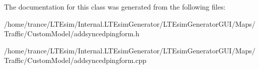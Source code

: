 The documentation for this class was generated from the following files\+:\begin{DoxyCompactItemize}
\item 
/home/trance/\+L\+T\+Esim/\+Internal.\+L\+T\+Esim\+Generator/\+L\+T\+Esim\+Generator\+G\+U\+I/\+Maps/\+Traffic/\+Custom\+Model/addsyncedpingform.\+h\item 
/home/trance/\+L\+T\+Esim/\+Internal.\+L\+T\+Esim\+Generator/\+L\+T\+Esim\+Generator\+G\+U\+I/\+Maps/\+Traffic/\+Custom\+Model/addsyncedpingform.\+cpp\end{DoxyCompactItemize}
